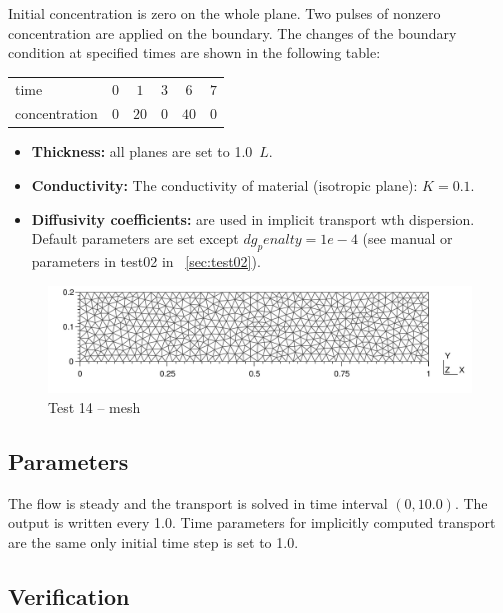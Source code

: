 Initial concentration is zero on the whole plane. Two pulses of nonzero concentration are applied on the boundary. The changes of the boundary condition at specified times are shown in the following table:
%
\begin{center}
  \begin{tabular}{|l|c|c|c|c|c|}
    \hline
    time & $0$ & $1$ & $3$ & $6$ & $7$\\
    concentration & $0$ & $20$ & $0$ & $40$ & $0$\\
    \hline
  \end{tabular}
\end{center}
%
\begin{itemize}
  \item \textbf{Thickness:} all planes are set to 1.0~$L$.
  \item \textbf{Conductivity:} The conductivity of material (isotropic plane): $K=0.1$.
  \item \textbf{Diffusivity coefficients:} are used in implicit transport wth dispersion. 
	Default parameters are set except $dg_penalty=1e-4$ (see manual or parameters in test02 in ~\ref{sec:test02}).
\end{itemize}
%
\begin{figure}[htb!]
\centering
\includegraphics[width=15cm]{tests_graphics/14_mesh.pdf}
\caption{Test 14 -- mesh}
\label{fig:test13_mesh}
\end{figure}
%
%
\subsection*{Parameters}
The flow is steady and the transport is solved in time interval $(0,10.0)$. The output is written every 1.0. Time parameters for implicitly computed transport are the same only initial time step is set to 1.0.

\subsection*{Verification}





